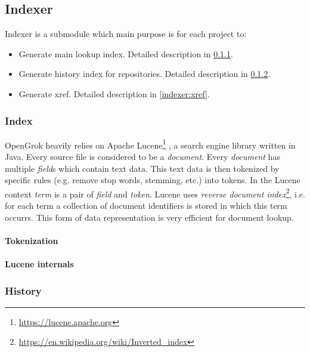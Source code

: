 \subsection{Indexer}
\label{indexer}

Indexer is a submodule which main purpose is for each project to:
\begin{itemize}
    \item Generate main lookup index. Detailed description in \ref{indexer:index}.
    \item Generate history index for repositories. Detailed description in \ref{indexer:history}.
    \item Generate xref. Detailed description in \ref{indexer:xref}.
\end{itemize}

\subsubsection{Index}
\label{indexer:index}

OpenGrok heavily relies on Apache Lucene\footnote{\url{https://lucene.apache.org}} \citep{lucene_in_action}, a search engine library
written in Java. Every source file is considered to be a \textit{document}. Every \textit{document} has multiple
\textit{field}s which contain text data. This text data is then tokenized by specific rules (e.g. remove stop words,
stemming, etc.) into tokens. In the Lucene context \textit{term} is a pair of \textit{field} and \textit{token}.
Lucene uses \textit{reverse document index}\footnote{\url{https://en.wikipedia.org/wiki/Inverted_index}},
i.e. for each term a collection of document identifiers is stored in which this term occurrs.
This form of data representation is very efficient for document lookup.

\paragraph{Tokenization}

\paragraph{Lucene internals}

\subsubsection{History}
\label{indexer:history}

